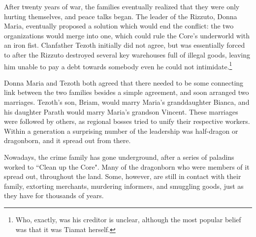 \begin{multicols}{2}
After twenty years of war, the families eventually realized that they were only hurting themselves, and peace talks began.
The leader of the Rizzuto, Donna Maria, eventually proposed a solution which would end the conflict: the two organizations would merge into one, which could rule the Core's underworld with an iron fist.
Clanfather Tezoth initially did not agree, but was essentially forced to after the Rizzuto destroyed several key warehouses full of illegal goods, leaving him unable to pay a debt towards somebody even he could not intimidate.\footnote{Who, exactly, was his creditor is unclear, although the most popular belief was that it was Tiamat herself.}

Donna Maria and Tezoth both agreed that there needed to be some connecting link between the two families besides a simple agreement, and soon arranged two marriages.
Tezoth's son, Briam, would marry Maria's granddaughter Bianca, and his daughter Parath would marry Maria's grandson Vincent.
These marriages were followed by others, as regional bosses tried to unify their respective workers.
Within a generation a surprising number of the leadership was half-dragon or dragonborn, and it spread out from there.

Nowadays, the crime family has gone underground, after a series of paladins worked to ``Clean up the Core".
Many of the dragonborn who were members of it spread out, throughout the land.
Some, however, are still in contact with their family, extorting merchants, murdering informers, and smuggling goods, just as they have for thousands of years.



\end{multicols}